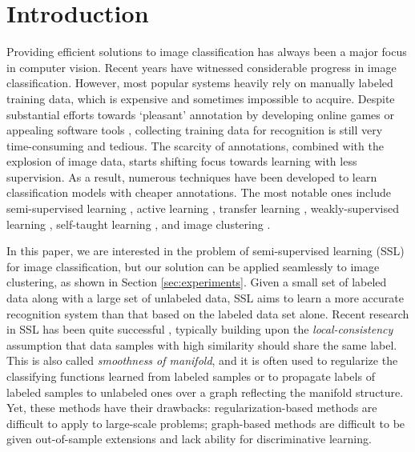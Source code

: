\section{Introduction}
\label{sec:intro}
Providing efficient solutions to image classification has always been a
major focus in computer vision. Recent years have witnessed
considerable progress in image classification. However, most popular
systems \citep{lazebnik:cvpr06, SVM-KNN, Bosch:iccv07, Boiman_CVPR_2008, Indoor, siftllc:cvpr10, 
Sun_2010, Yang_2014_CVPR} heavily rely
on manually labeled training data, which is expensive and sometimes
impossible to acquire. Despite substantial efforts towards
`pleasant' annotation by developing online games \citep{game:purpose}
or appealing software tools \citep{labelme}, collecting training data
for recognition is still very time-consuming and tedious. The scarcity
of annotations, combined with the explosion of image data, starts
shifting focus towards learning with less supervision. As a result,
numerous techniques have been developed to learn classification models
with cheaper annotations. The most notable ones include
semi-supervised learning \citep{Fergus09, Guillaumin:cvpr:10, dai:iccv13b}, 
active learning \citep{JainK:cvpr09, cvpr09:multi:al},
transfer learning \citep{Transfer:CVPR:08, tl:survey},
weakly-supervised learning \citep{cvpr12:weak:video, metric:imitation}, self-taught learning
\citep{self-taught:icml07}, and image clustering
\citep{Sivic05b, dai}.

In this paper, we are interested in the problem of semi-supervised
learning (SSL) for image classification, but our solution can be
applied seamlessly to image clustering, as shown in Section
\ref{sec:experiments}. Given a small set of labeled data along with a
large set of unlabeled data, SSL aims to learn a more accurate
recognition system than that based on the labeled data set alone.  
Recent research in SSL has been quite successful
\citep{Fergus09, SemiForest, SemiBoost, Zhu:ISL:2009, book06:ssl,
  eccv10:ssl, ecml14:ssl, nips14:ssl}, typically building upon the
\emph{local-consistency} assumption that data samples with high
similarity should share the same label. This is also called
\emph{smoothness of manifold}, and it is often used to regularize the
classifying functions learned from labeled samples or to propagate
labels of labeled samples to unlabeled ones over a graph reflecting
the manifold structure. Yet, these methods have their drawbacks:
regular\-ization-based methods \citep{Joachims:1999, neverhurt:icml11}
are difficult to apply to large-scale problems; graph-based methods
\citep{Zhu:Harmonic:03, Zhou:nips:04, Fergus09,icml10:large:graph:ssl}
are difficult to be given out-of-sample extensions and lack ability
for discriminative learning.

